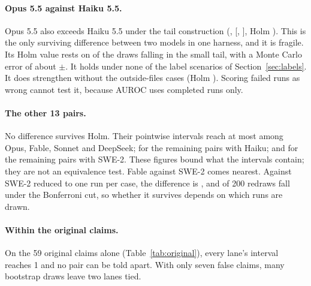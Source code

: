 \documentclass[11pt]{article}
\begin{document}
\paragraph{Opus 5.5 against Haiku 5.5.} Opus 5.5 also exceeds Haiku 5.5 under the tail construction (, [, ], Holm ). This is the only surviving difference between two models in one harness, and it is fragile. Its Holm value rests on  of the  draws falling in the small tail, with a Monte Carlo error of about $\pm$. It holds under none of the label scenarios of Section~\ref{sec:labels}. It does strengthen without the  outside-files cases (Holm ). Scoring failed runs as wrong cannot test it, because AUROC uses completed runs only.

\paragraph{The other 13 pairs.} No difference survives Holm. Their pointwise intervals reach at most  among Opus, Fable, Sonnet and DeepSeek;  for the remaining pairs with Haiku; and  for the remaining pairs with SWE-2. These figures bound what the intervals contain; they are not an equivalence test. Fable against SWE-2 comes nearest. Against SWE-2 reduced to one run per case, the difference is , and  of 200 redraws fall under the Bonferroni cut, so whether it survives depends on which runs are drawn.

\paragraph{Within the original claims.} On the 59 original claims alone (Table~\ref{tab:original}), every lane's interval reaches 1 and no pair can be told apart. With only seven false claims, many bootstrap draws leave two lanes tied.

\begin{table}[h]
\centering\small

\caption{Within the 59 original audit claims (52 real, 7 false). Intervals: claim-family percentile bootstrap.}
\label{tab:original}
\end{table}

\begin{table}[h]
\centering\small

\caption{Pairwise AUROC differences, claim-family bootstrap, Holm-adjusted over 15 pairs. Intervals are pointwise. A $p$ printed with $<$ had no draw on the small side.}
\label{tab:aurocpairs}
\end{table}
\end{document}
